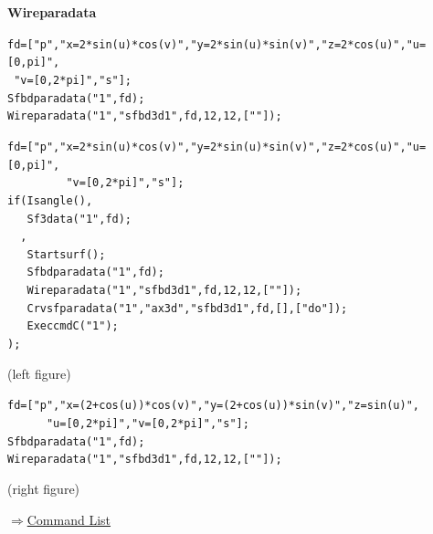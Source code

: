 \documentclass[papersize,a4paper,12pt]{article}
\newenvironment{cmd}[2]{
\hypertarget{#2}{}
\begin{center}{\bf\large #1}\end{center}
\begin{description}
}{
\end{description}
\begin{flushright} \hyperlink{functionlist}{$\Rightarrow$Command List}\end{flushright}
}
\begin{document}
\begin{cmd}{Wireparadata}{wireparadata}
\verb|fd=["p","x=2*sin(u)*cos(v)","y=2*sin(u)*sin(v)","z=2*cos(u)","u=[0,pi]", |\\
\verb| "v=[0,2*pi]","s"]; |\\
\verb|Sfbdparadata("1",fd); |\\
\verb|Wireparadata("1","sfbd3d1",fd,12,12,[""]); |

\begin{center}

\end{center}


\verb|fd=["p","x=2*sin(u)*cos(v)","y=2*sin(u)*sin(v)","z=2*cos(u)","u=[0,pi]",|\\
\verb|         "v=[0,2*pi]","s"];|\\
\verb|if(Isangle(),|\\
\verb|   Sf3data("1",fd);|\\
\verb|  ,|\\
\verb|   Startsurf();|\\
\verb|   Sfbdparadata("1",fd);|\\
\verb|   Wireparadata("1","sfbd3d1",fd,12,12,[""]);|\\
\verb|   Crvsfparadata("1","ax3d","sfbd3d1",fd,[],["do"]);|\\
\verb|   ExeccmdC("1");|\\
\verb|);|

(left figure)

\vspace{\baselineskip}
\verb|fd=["p","x=(2+cos(u))*cos(v)","y=(2+cos(u))*sin(v)","z=sin(u)",|\\
\verb|      "u=[0,2*pi]","v=[0,2*pi]","s"];|\\
\verb|Sfbdparadata("1",fd);|\\
\verb|Wireparadata("1","sfbd3d1",fd,12,12,[""]); |

(right figure)

\begin{center} \hspace{10mm} \end{center}

\end{cmd}
\end{document}
